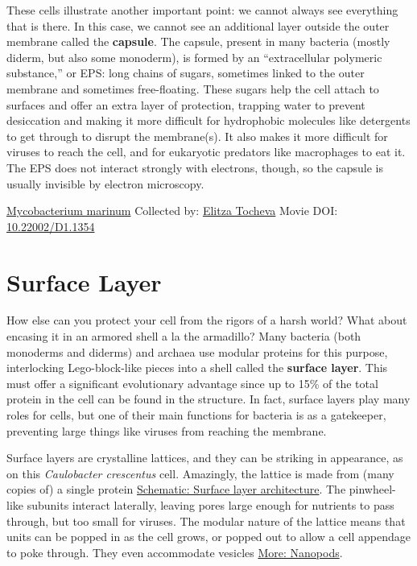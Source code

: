 \documentclass[]{tufte-book}
\begin{document}
These cells illustrate another important point: we cannot always see everything that is there. In this case, we cannot see an additional layer outside the outer membrane called the \textbf{capsule}. The capsule, present in many bacteria (mostly diderm, but also some monoderm), is formed by an ``extracellular polymeric substance,'' or EPS: long chains of sugars, sometimes linked to the outer membrane and sometimes free-floating. These sugars help the cell attach to surfaces and offer an extra layer of protection, trapping water to prevent desiccation and making it more difficult for hydrophobic molecules like detergents to get through to disrupt the membrane(s). It also makes it more difficult for viruses to reach the cell, and for eukaryotic predators like macrophages to eat it. The EPS does not interact strongly with electrons, though, so the capsule is usually invisible by electron microscopy.



\hypertarget{htmlwidget-b78605398fb56816a296}{}

\label{fig:2-5}\protect\hyperlink{tree}{Mycobacterium marinum} Collected by: \protect\hyperlink{elitza_tocheva}{Elitza Tocheva} Movie DOI: \href{https://doi.org/10.22002/D1.1354}{10.22002/D1.1354}

\hypertarget{surface-layer}{%
\section{Surface Layer}\label{surface-layer}}

How else can you protect your cell from the rigors of a harsh world? What about encasing it in an armored shell a la the armadillo? Many bacteria (both monoderms and diderms) and archaea use modular proteins for this purpose, interlocking Lego-block-like pieces into a shell called the \textbf{surface layer}. This must offer a significant evolutionary advantage since up to 15\% of the total protein in the cell can be found in the structure. In fact, surface layers play many roles for cells, but one of their main functions for bacteria is as a gatekeeper, preventing large things like viruses from reaching the membrane.

Surface layers are crystalline lattices, and they can be striking in appearance, as on this \emph{Caulobacter crescentus} cell. Amazingly, the lattice is made from (many copies of) a single protein \protect\hyperlink{Surface_layer_architecture}{Schematic: Surface layer architecture}. The pinwheel-like subunits interact laterally, leaving pores large enough for nutrients to pass through, but too small for viruses. The modular nature of the lattice means that units can be popped in as the cell grows, or popped out to allow a cell appendage to poke through. They even accommodate vesicles \protect\hyperlink{Nanopods}{More: Nanopods}.
\end{document}
